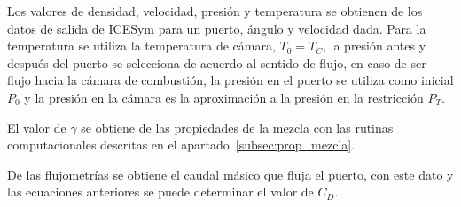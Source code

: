 Los valores de densidad, velocidad, presión y temperatura se obtienen de los
datos de salida de ICESym para un puerto, ángulo y velocidad dada.
%
Para la temperatura se utiliza la temperatura de cámara, $T_0 = T_C$, la
presión antes y después del puerto se selecciona de acuerdo al sentido de
flujo, en caso de ser flujo hacia la cámara de combustión, la presión en el
puerto se utiliza como inicial $P_0$ y la presión en la cámara es la
aproximación a la presión en la restricción $P_T$.

El valor de $\gamma$ se obtiene de las propiedades de la mezcla con las rutinas
computacionales descritas en el apartado~\ref{subsec:prop_mezcla}.

De las flujometrías se obtiene el caudal másico que fluja el puerto, con este
dato y las ecuaciones anteriores se puede determinar el valor de $C_{D}$.







